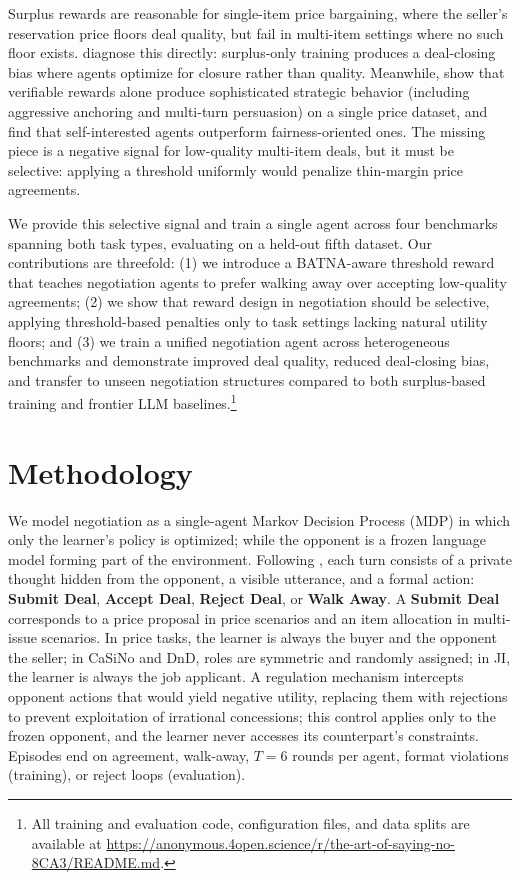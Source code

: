 \documentclass[11pt]{article}
\begin{document}
Surplus rewards are reasonable for single-item price bargaining, where the seller's reservation price floors deal quality, but fail in multi-item settings where no such floor exists. \citet{bergemann2026bilateral} diagnose this directly: surplus-only training produces a deal-closing bias where agents optimize for closure rather than quality. Meanwhile, \citet{liu2026instructing} show that verifiable rewards alone produce sophisticated strategic behavior (including aggressive anchoring and multi-turn persuasion) on a single price dataset, and \citet{chawla2023selfish} find that self-interested agents outperform fairness-oriented ones. The missing piece is a negative signal for low-quality multi-item deals, but it must be selective: applying a threshold uniformly would penalize thin-margin price agreements.

We provide this selective signal and train a single agent across four benchmarks spanning both task types, evaluating on a held-out fifth dataset. Our contributions are threefold: (1) we introduce a BATNA-aware threshold reward that teaches negotiation agents to prefer walking away over accepting low-quality agreements; (2) we show that reward design in negotiation should be selective, applying threshold-based penalties only to task settings lacking natural utility floors; and (3) we train a unified negotiation agent across heterogeneous benchmarks and demonstrate improved deal quality, reduced deal-closing bias, and transfer to unseen negotiation structures compared to both surplus-based training and frontier LLM baselines.\footnote{All training and evaluation code, configuration files, and data splits are available at \url{https://anonymous.4open.science/r/the-art-of-saying-no-8CA3/README.md}.}

\section{Methodology}

We model negotiation as a single-agent Markov Decision Process (MDP) in which only the learner's policy is optimized; while the opponent is a frozen language model forming part of the environment. Following \citet{he2018decoupling}, each turn consists of a private thought hidden from the opponent, a visible utterance, and a formal action: \textbf{Submit Deal}, \textbf{Accept Deal}, \textbf{Reject Deal}, or \textbf{Walk Away}. A \textbf{Submit Deal} corresponds to a price proposal in price scenarios and an item allocation in multi-issue scenarios. In price tasks, the learner is always the buyer and the opponent the seller; in CaSiNo and DnD, roles are symmetric and randomly assigned; in JI, the learner is always the job applicant. A regulation mechanism intercepts opponent actions that would yield negative utility, replacing them with rejections to prevent exploitation of irrational concessions; this control applies only to the frozen opponent, and the learner never accesses its counterpart's constraints. Episodes end on agreement, walk-away, $T{=}6$ rounds per agent, format violations (training), or reject loops (evaluation).
\end{document}

